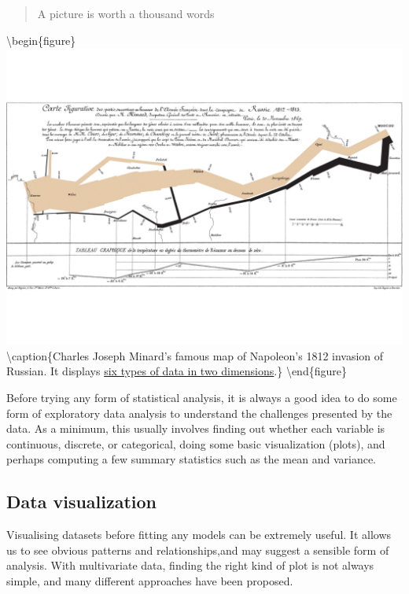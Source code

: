 \documentclass[]{book}
\theoremstyle{definition}
\theoremstyle{definition}
\theoremstyle{definition}
\theoremstyle{remark}
\begin{document}
\begin{quote}
A picture is worth a thousand words
\end{quote}

\textbackslash{}begin\{figure\}
\includegraphics[width=27.82in]{figs/Minard} \textbackslash{}caption\{Charles Joseph Minard's famous map of Napoleon's 1812 invasion of Russian. It displays \href{https://en.wikipedia.org/wiki/Charles_Joseph_Minard\#The_map_of_Napoleon's_Russian_campaign}{six types of data in two dimensions}.\}\label{fig:unnamed-chunk-5}
\textbackslash{}end\{figure\}

Before trying any form of statistical analysis, it is always a good idea to do some form of exploratory data analysis to understand the challenges presented by the data. As a minimum, this usually involves finding out whether each variable is continuous, discrete, or categorical, doing some basic visualization (plots), and perhaps computing a few summary statistics such as the mean and variance.

\hypertarget{data-visualization}{%
\subsection{Data visualization}\label{data-visualization}}

Visualising datasets before fitting any models can be extremely useful. It allows us to see obvious patterns and relationships,and may suggest a sensible form of analysis.
With multivariate data, finding the right kind of plot is not always simple, and many different approaches have been proposed.
\end{document}
